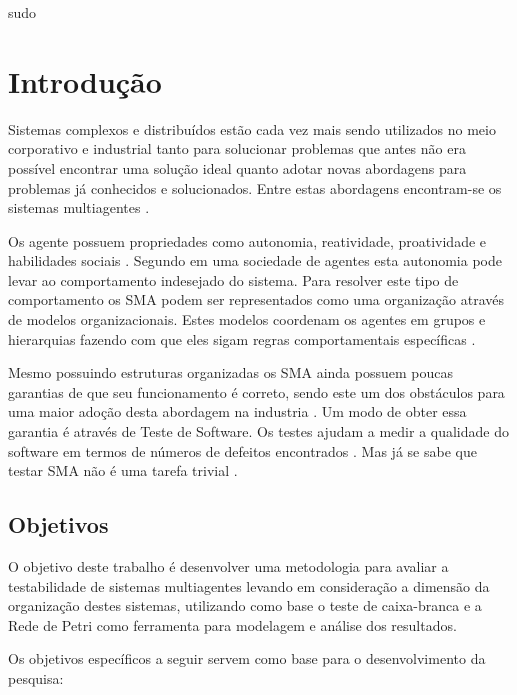 sudo

\tableofcontents

\chapter{Introdução}
  
Sistemas complexos e distribuídos estão cada vez mais sendo utilizados no meio corporativo e industrial tanto para solucionar problemas que antes não era possível encontrar uma solução ideal quanto adotar novas abordagens para problemas já conhecidos e solucionados. Entre estas abordagens encontram-se os sistemas multiagentes \cite{benfield2006making}.

Os agente possuem propriedades como autonomia, reatividade, proatividade e habilidades sociais \cite{jennings2000agent}. Segundo \citet{hubner2007developing} em uma sociedade de agentes esta autonomia pode levar ao comportamento indesejado do sistema. Para resolver este tipo de comportamento os SMA podem ser representados como uma organização através de modelos organizacionais. Estes modelos coordenam os agentes em grupos e hierarquias fazendo com que eles sigam regras comportamentais específicas \cite{van2005formal, argente2006multi}.

Mesmo possuindo estruturas organizadas os SMA ainda possuem poucas garantias de que seu funcionamento é correto, sendo este um dos obstáculos para uma maior adoção desta abordagem na industria \cite{houhamdi2011multi,winikoff2010assurance}. Um modo de obter essa garantia é através de Teste de Software. Os testes ajudam a medir a qualidade do software em termos de números de defeitos encontrados \cite{graham2008foundations}. Mas já se sabe que testar SMA não é uma tarefa trivial \cite{winikoff2010assurance}.


\section{Objetivos}

O objetivo deste trabalho é desenvolver uma metodologia para avaliar a testabilidade de sistemas multiagentes levando em consideração a dimensão da organização destes sistemas, utilizando como base o teste de caixa-branca e a Rede de Petri como ferramenta para modelagem e análise dos resultados.

Os objetivos específicos a seguir servem como base para o desenvolvimento da pesquisa:

